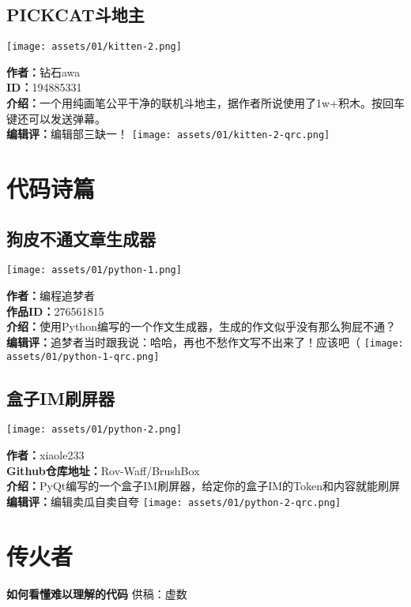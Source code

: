 \documentclass[UTF8,fontset=fandol]{article}
\begin{document}
\subsection{PICKCAT斗地主}
\texttt{[image: assets/01/kitten-2.png]}

\noindent
\textbf{作者：}钻石awa \\
\textbf{ID：}194885331 \\
\textbf{介绍：}一个用纯画笔公平干净的联机斗地主，据作者所说使用了1w+积木。按回车键还可以发送弹幕。\\
\textbf{编辑评：}编辑部三缺一！
\hfill\texttt{[image: assets/01/kitten-2-qrc.png]}

\pagebreak
\section{代码诗篇}
\subsection{狗皮不通文章生成器}
\texttt{[image: assets/01/python-1.png]}

\noindent
\textbf{作者：}编程追梦者 \\
\textbf{作品ID：}276561815 \\
\textbf{介绍：}使用Python编写的一个作文生成器，生成的作文似乎没有那么狗屁不通？\\
\textbf{编辑评：}追梦者当时跟我说：哈哈，再也不愁作文写不出来了！应该吧（
\hfill \texttt{[image: assets/01/python-1-qrc.png]}

\subsection{盒子IM刷屏器}
\texttt{[image: assets/01/python-2.png]}

\noindent
\textbf{作者：}xiaole233 \\
\textbf{Github仓库地址：}Rov-Waff/BrushBox \\
\textbf{介绍：}PyQt编写的一个盒子IM刷屏器，给定你的盒子IM的Token和内容就能刷屏\\
\textbf{编辑评：}编辑卖瓜自卖自夸
\hfill \texttt{[image: assets/01/python-2-qrc.png]}

\pagebreak
\section{传火者}
\begin{center}
	\textbf{如何看懂难以理解的代码}
	\normalsize
	供稿：虚数
\end{center}
\end{document}
